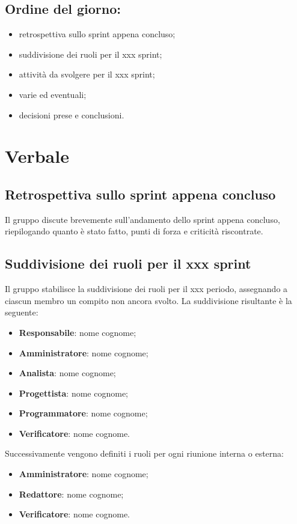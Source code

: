 \documentclass[italian,12pt]{article}
\begin{document}
\subsection*{Ordine del giorno:}
\begin{itemize}
	\item retrospettiva sullo sprint appena concluso;
	\item suddivisione dei ruoli per il xxx sprint; %
	\item attività da svolgere per il xxx sprint; %
	\item varie ed eventuali;  %
	\item decisioni prese e conclusioni.
\end{itemize}


\newpage

\section{Verbale}

\subsection{Retrospettiva sullo sprint appena concluso}
Il gruppo discute brevemente sull'andamento dello sprint appena concluso, riepilogando quanto è stato fatto, punti di forza e criticità riscontrate. %

\subsection{Suddivisione dei ruoli per il xxx sprint} %
Il gruppo stabilisce la suddivisione dei ruoli per il xxx periodo, assegnando a ciascun membro un compito non ancora svolto. La suddivisione risultante è la seguente: %
\begin{itemize}
	\item \textbf{Responsabile}: nome cognome;
	\item \textbf{Amministratore}: nome cognome;
	\item \textbf{Analista}: nome cognome;
	\item \textbf{Progettista}: nome cognome;
	\item \textbf{Programmatore}: nome cognome;
	\item \textbf{Verificatore}: nome cognome.
\end{itemize}
Successivamente vengono definiti i ruoli per ogni riunione interna o esterna:
\begin{itemize}
	\item \textbf{Amministratore}: nome cognome;
	\item \textbf{Redattore}: nome cognome;
	\item \textbf{Verificatore}: nome cognome.
\end{itemize}
\end{document}
